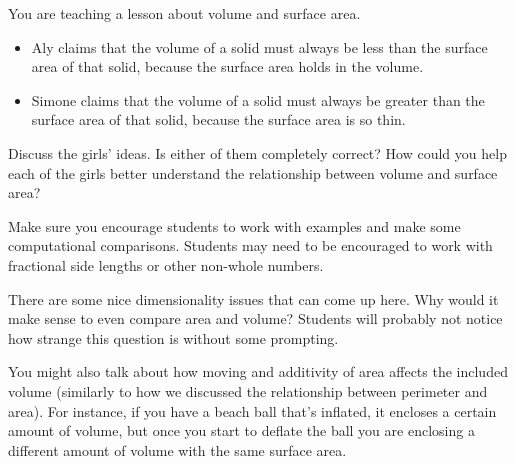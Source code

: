 \documentclass{ximera}
\begin{document}
\newpage
\begin{problem}
You are teaching a lesson about volume and surface area.
    \begin{itemize}
        \item Aly claims that the volume of a solid must always be less than the surface area of that solid, because the surface area holds in the volume.
        \item Simone claims that the volume of a solid must always be greater than the surface area of that solid, because the surface area is so thin.
    \end{itemize}
    Discuss the girls' ideas.  Is either of them completely correct?  How could you help each of the girls better understand the relationship between volume and surface area?
    
    \begin{instructorNotes}
    Make sure you encourage students to work with examples and make some computational comparisons.  Students may need to be encouraged to work with fractional side lengths or other non-whole numbers.
    
    There are some nice dimensionality issues that can come up here.  Why would it make sense to even compare area and volume?  Students will probably not notice how strange this question is without some prompting.  
    
    You might also talk about how moving and additivity of area affects the included volume (similarly to how we discussed the relationship between perimeter and area).  For instance, if you have a beach ball that's inflated, it encloses a certain amount of volume, but once you start to deflate the ball you are enclosing a different amount of volume with the same surface area.
    \end{instructorNotes}
\end{problem}
\end{document}
